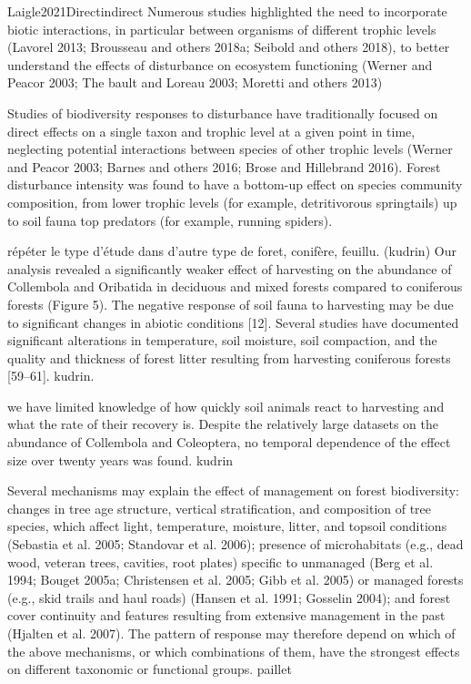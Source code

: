
Laigle2021Directindirect
Numerous studies highlighted the need to incorporate biotic interactions, in particular between organisms of different trophic levels (Lavorel 2013; Brousseau and others 2018a; Seibold and others 2018), to better understand the effects of disturbance on ecosystem functioning (Werner and Peacor 2003; The bault and Loreau 2003; Moretti and others 2013)

Studies of biodiversity responses to disturbance have traditionally focused on direct effects on a single taxon and trophic level at a given point in time, neglecting potential interactions between species of other trophic levels (Werner and Peacor 2003; Barnes and others 2016; Brose and Hillebrand 2016).
Forest disturbance intensity was found to have a bottom-up effect on species community composition, from lower trophic levels (for example, detritivorous springtails) up to soil fauna top predators (for example, running spiders).

  répéter le type d'étude dans d'autre type de foret, conifère, feuillu. (kudrin)
  Our analysis revealed a significantly weaker effect of harvesting on the abundance of Collembola and Oribatida in deciduous and mixed forests compared to coniferous forests (Figure 5). The negative response of soil fauna to harvesting may be due to significant changes in abiotic conditions [12]. Several studies have documented significant alterations in temperature, soil moisture, soil compaction, and the quality and thickness of forest litter resulting from harvesting coniferous forests [59–61]. kudrin.

  we have limited knowledge of how quickly soil animals react to harvesting and what the rate of their recovery is.
  Despite the relatively large datasets on the abundance of Collembola and Coleoptera, no temporal dependence of the effect size over twenty years was found. kudrin


  Several mechanisms may explain the effect of management on forest biodiversity: changes in tree age structure, vertical stratification, and composition of tree species, which affect light, temperature, moisture, litter, and topsoil conditions (Sebastia et al. 2005; Standovar et al. 2006); presence of microhabitats (e.g., dead wood, veteran trees, cavities, root plates) specific to unmanaged (Berg et al. 1994; Bouget 2005a; Christensen et al. 2005; Gibb et al. 2005) or managed forests (e.g., skid trails and haul roads) (Hansen et al. 1991; Gosselin 2004); and forest cover continuity and features resulting from extensive management in the past (Hjalten et al. 2007). The pattern of response may therefore depend on which of the above mechanisms, or which combinations of them, have the strongest effects on different taxonomic or functional groups. paillet 

